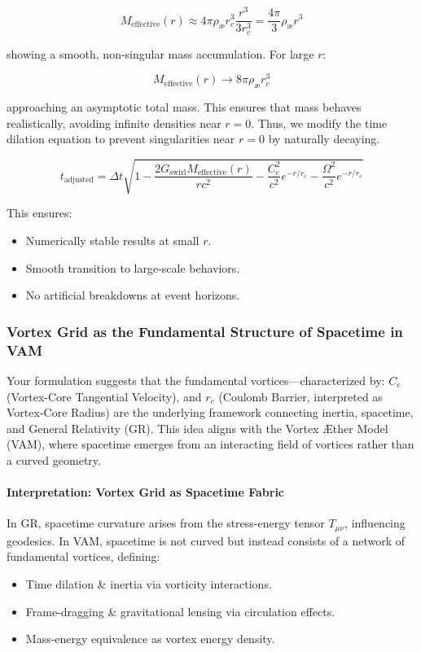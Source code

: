 \begin{equation*}
    M_\text{effective}(r) \approx 4\pi \rho_\text{\ae} r_c^3 \frac{r^3}{3 r_c^3} = \frac{4\pi}{3} \rho_\text{\ae} r^3
\end{equation*}

showing a smooth, non-singular mass accumulation. For large $r$:

\begin{equation*}
    M_\text{effective}(r) \to 8\pi \rho_\text{\ae} r_c^3
\end{equation*}

approaching an asymptotic total mass. This ensures that mass behaves realistically, avoiding infinite densities near $r=0$. Thus, we modify the time dilation equation to prevent singularities near $r = 0$ by naturally decaying.

\begin{equation*}
    \boxed{t_\text{adjusted} = \Delta t \sqrt{1 - \frac{2  G_\text{swirl} M_\text{effective}(r)}{r c^2} - \frac{C_e^2}{c^2} e^{-r/r_c} - \frac{\Omega^2}{c^2} e^{-r/r_c}}}
\end{equation*}

This ensures:
\begin{itemize}
    \item Numerically stable results at small $r$.
    \item Smooth transition to large-scale behaviors.
    \item No artificial breakdowns at event horizons.
\end{itemize}




\subsubsection*{Vortex Grid as the Fundamental Structure of Spacetime in VAM}
Your formulation suggests that the fundamental vortices—characterized by:
$C_e$ (Vortex-Core Tangential Velocity), and
$r_c$ (Coulomb Barrier, interpreted as Vortex-Core Radius)
are the underlying framework connecting inertia, spacetime, and General Relativity (GR). This idea aligns with the Vortex Æther Model (VAM), where spacetime emerges from an interacting field of vortices rather than a curved geometry.

\paragraph{Interpretation: Vortex Grid as Spacetime Fabric}
In GR, spacetime curvature arises from the stress-energy tensor $T_{\mu\nu}$, influencing geodesics.
In VAM, spacetime is not curved but instead consists of a network of fundamental vortices, defining:
\begin{itemize}
    \item Time dilation \& inertia via vorticity interactions.
    \item Frame-dragging \& gravitational lensing via circulation effects.
    \item Mass-energy equivalence as vortex energy density.
\end{itemize}

